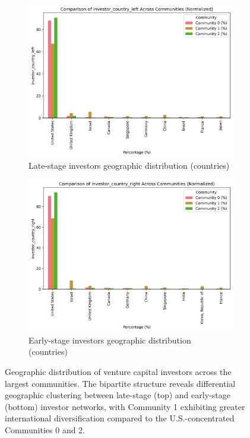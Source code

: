 
\begin{figure}[htp]
\centering
\begin{subfigure}{0.8\textwidth}
    \centering
    \includegraphics[width=1\textwidth]{../figures/us/categorical_comparison_investor_country_left.png}
    \caption{Late-stage investors geographic distribution (countries)}
    \label{fig:late_stage_geo}
\end{subfigure}

\vspace{0.5em}

\begin{subfigure}{0.8\textwidth}
    \centering
    \includegraphics[width=1\textwidth]{../figures/us/categorical_comparison_investor_country_right.png}
    \caption{Early-stage investors geographic distribution (countries)}
    \label{fig:early_stage_geo}
\end{subfigure}
\caption{Geographic distribution of venture capital investors across the largest communities. The bipartite structure reveals differential geographic clustering between late-stage (top) and early-stage (bottom) investor networks, with Community 1 exhibiting greater international diversification compared to the U.S.-concentrated Communities 0 and 2.}
\label{fig:geographic_distribution}
\end{figure}

